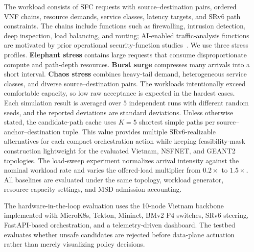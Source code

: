 \documentclass[final,5p]{elsarticle}
\begin{document}
The workload consists of SFC requests with source--destination pairs, ordered VNF chains, resource demands, service classes, latency targets, and SRv6 path constraints. The chains include functions such as firewalling, intrusion detection, deep inspection, load balancing, and routing; AI-enabled traffic-analysis functions are motivated by prior operational security-function studies~\cite{jSAID23,jAPELID24,cCSFS25}. We use three stress profiles. \textbf{Elephant stress} contains large requests that consume disproportionate compute and path-depth resources. \textbf{Burst surge} compresses many arrivals into a short interval. \textbf{Chaos stress} combines heavy-tail demand, heterogeneous service classes, and diverse source--destination pairs. The workloads intentionally exceed comfortable capacity, so low raw acceptance is expected in the hardest cases. 
Each simulation result is averaged over \(5\) independent runs with different random seeds, and the reported deviations are standard deviations. 
Unless otherwise stated, the candidate-path cache uses \(K=5\) shortest simple paths per source--anchor--destination tuple. This value provides multiple SRv6-realizable alternatives for each compact orchestration action while keeping feasibility-mask construction lightweight for the evaluated Vietnam, NSFNET, and GEANT2 topologies.
The load-sweep experiment normalizes arrival intensity against the nominal workload rate and varies the offered-load multiplier from \(0.2\times\) to \(1.5\times\). All baselines are evaluated under the same topology, workload generator, resource-capacity settings, and MSD-admission accounting.

The hardware-in-the-loop evaluation uses the 10-node Vietnam backbone implemented with MicroK8s, Tekton, Mininet, BMv2 P4 switches, SRv6 steering, FastAPI-based orchestration, and a telemetry-driven dashboard. The testbed evaluates whether unsafe candidates are rejected before data-plane actuation rather than merely visualizing policy decisions.
\end{document}
